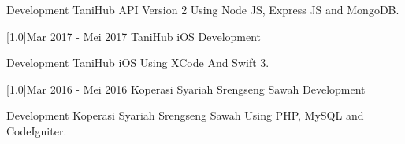 \documentclass[english]{cv-style}
\begin{document}
\begin{entrylist}
{\begin{itemize}
{    \item Development TaniHub API Version 2 Using Node JS, Express JS and MongoDB.}
  \end{itemize}}
\entry
{\scalebox{.6}[1.0]{Mar 2017 - Mei 2017}}
{TaniHub iOS Development}
{}
{\vspace{-0.3cm}
  \begin{itemize}\small{
    \item Development TaniHub iOS Using XCode And Swift 3.}
  \end{itemize}}
\entry
{\scalebox{.6}[1.0]{Mar 2016 - Mei 2016}}
{Koperasi Syariah Srengseng Sawah Development}
{}
{\vspace{-0.3cm}
  \begin{itemize}\small{
    \item Development Koperasi Syariah Srengseng Sawah Using PHP, MySQL and CodeIgniter.}
  \end{itemize}}
\end{entrylist}
\end{document}
